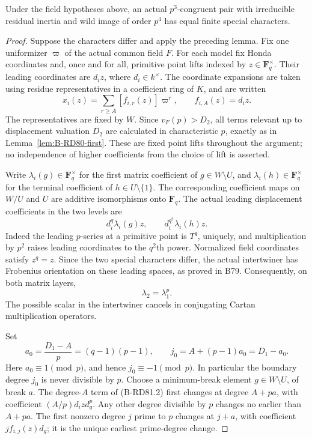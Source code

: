 \begin{proposition}
\label{prop:B-RD81-Cartan}
Under the field hypotheses above, an actual \(p^3\)-congruent
pair with irreducible residual inertia and wild image of order
\(p^4\) has equal finite special characters.
\end{proposition}
\begin{proof}
Suppose the characters differ and apply the preceding lemma.
Fix one uniformizer \(\varpi\) of the actual common field \(F\).
For each model fix Honda coordinates and, once and for all,
primitive point lifts indexed by \(z\in\mathbf F_q^\times\).
Their leading coordinates are \(d_i z\), where \(d_i\in k^\times\).
The coordinate expansions are taken using residue representatives
in a coefficient ring of \(K\), and are written
\[
 x_i(z)=\sum_{r\ge A}[f_{i,r}(z)]\varpi^r,
 \qquad f_{i,A}(z)=d_i z.                             \tag{B-RD81.2}
\]
The representatives are fixed by \(W\). Since \(v_F(p)>D_2\),
all terms relevant up to displacement valuation \(D_2\) are
calculated in characteristic \(p\), exactly as in
Lemma~\ref{lem:B-RD80-first}. These are fixed point lifts
throughout the argument; no independence of higher coefficients
from the choice of lift is asserted.

Write \(\lambda_i(g)\in\mathbf F_q^\times\) for the first
matrix coefficient of \(g\in W\setminus U\), and
\(\lambda_i(h)\in\mathbf F_q^\times\) for the terminal
coefficient of \(h\in U\setminus\{1\}\). The corresponding
coefficient maps on \(W/U\) and \(U\) are additive isomorphisms
onto \(\mathbf F_q\). The actual leading displacement
coefficients in the two levels are
\[
 d_i^q\lambda_i(g)z,
 \qquad d_i^{q^2}\lambda_i(h)z.                       \tag{B-RD81.3}
\]
Indeed the leading \(p\)-series at a primitive point is
\(T^q\), uniquely, and multiplication by \(p^2\) raises
leading coordinates to the \(q^2\)th power. Normalized field
coordinates satisfy \(z^q=z\). Since the two special
characters differ, the actual intertwiner has Frobenius
orientation on these leading spaces, as proved in B79.
Consequently, on both matrix layers,
\[
                   \lambda_2=\lambda_1^p.             \tag{B-RD81.4}
\]
The possible scalar in the intertwiner cancels in conjugating
Cartan multiplication operators.

Set
\[
 a_0=\frac{D_1-A}{p}=(q-1)(p-1),\qquad
 j_0=A+(p-1)a_0=D_1-a_0.                             \tag{B-RD81.5}
\]
Here \(a_0\equiv1\pmod p\), and hence
\(j_0\equiv-1\pmod p\). In particular the boundary degree
\(j_0\) is never divisible by \(p\).
Choose a minimum-break element \(g\in W\setminus U\), of
break \(a\). The degree-\(A\) term of (B-RD81.2) first
changes at degree \(A+pa\), with coefficient
\((A/p)d_i z d_g^p\). Any other degree divisible by \(p\)
changes no earlier than \(A+pa\). The first nonzero degree
\(j\) prime to \(p\) changes at \(j+a\), with coefficient
\(j f_{i,j}(z)d_g\); it is the unique earliest prime-degree
change.


\end{proof}
